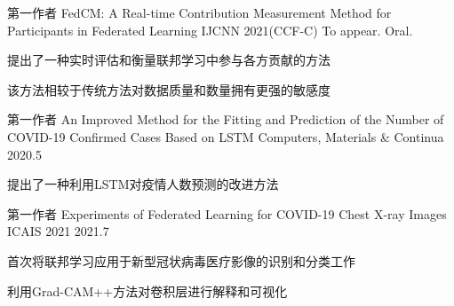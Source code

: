 

\begin{cventries}
	\cventry
	{第一作者} %
	{FedCM: A Real-time Contribution Measurement Method for Participants in Federated Learning} %
	{IJCNN 2021(CCF-C)} %
	{To appear. Oral.} %
	{
		\begin{cvitems} %
			\item {提出了一种实时评估和衡量联邦学习中参与各方贡献的方法}
			\item {该方法相较于传统方法对数据质量和数量拥有更强的敏感度}
		\end{cvitems}
	}

  \cventry
    {第一作者} %
    {An Improved Method for the Fitting and Prediction of the Number of COVID-19 Confirmed Cases Based on LSTM} %
    {Computers, Materials \& Continua} %
    {2020.5} %
    {
      \begin{cvitems} %
      	\item {提出了一种利用LSTM对疫情人数预测的改进方法}
      \end{cvitems}
    }

	\cventry
	{第一作者} %
	{Experiments of Federated Learning for COVID-19 Chest X-ray Images} %
	{ICAIS 2021} %
	{2021.7} %
	{
		\begin{cvitems} %
			\item {首次将联邦学习应用于新型冠状病毒医疗影像的识别和分类工作}
			\item {利用Grad-CAM++方法对卷积层进行解释和可视化}
		\end{cvitems}
	}

\end{cventries}
